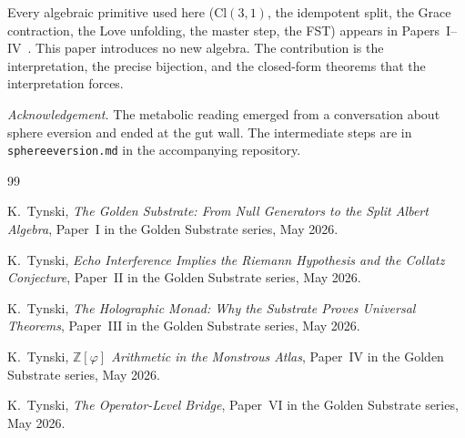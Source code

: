 \documentclass[11pt,a4paper]{article}
\theoremstyle{plain}
\theoremstyle{definition}
\theoremstyle{remark}
\numberwithin{equation}{section}
\providecommand{\Cl}{\mathrm{Cl}}
\providecommand{\Z}{\mathbb{Z}}
\providecommand{\vp}{\varphi}
\begin{document}
Every algebraic primitive used here ($\Cl(3,1)$, the idempotent
split, the Grace contraction, the Love unfolding, the master step,
the FST) appears in Papers~I--IV~\cite{paper-I,paper-II,paper-III,paper-IV}. This paper introduces no new
algebra. The contribution is the interpretation, the precise
bijection, and the closed-form theorems that the interpretation
forces.

\bigskip\noindent
\textit{Acknowledgement.} The metabolic reading emerged from a
conversation about sphere eversion and ended at the gut wall.
The intermediate steps are in
\texttt{sphereeversion.md} in the accompanying repository.

\begin{thebibliography}{99}

  K.~Tynski,
  \emph{The Golden Substrate: From Null Generators to the Split Albert Algebra},
  Paper~I in the Golden Substrate series, May 2026.

  K.~Tynski,
  \emph{Echo Interference Implies the Riemann Hypothesis and the Collatz Conjecture},
  Paper~II in the Golden Substrate series, May 2026.

  K.~Tynski,
  \emph{The Holographic Monad: Why the Substrate Proves Universal Theorems},
  Paper~III in the Golden Substrate series, May 2026.

  K.~Tynski,
  \emph{$\Z[\vp]$ Arithmetic in the Monstrous Atlas},
  Paper~IV in the Golden Substrate series, May 2026.

  K.~Tynski,
  \emph{The Operator-Level Bridge},
  Paper~VI in the Golden Substrate series, May 2026.

\end{thebibliography}
\end{document}
